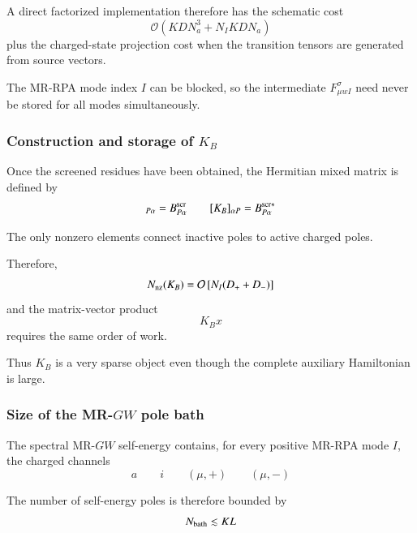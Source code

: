 \documentclass[aip,jcp,reprint,noshowkeys,superscriptaddress]{revtex4-1}
\begin{document}
A direct factorized implementation therefore has the schematic cost
\begin{equation}
  \mathcal O
  \left(
    KDN_a^3
    +
    N_IKDN_a
  \right)
  \label{eq:B-factorized-cost}
\end{equation}
plus the charged-state projection cost when the transition tensors are
generated from source vectors.

The MR-RPA mode index $I$ can be blocked, so the intermediate
$F_{\mu w I}^{\sigma}$ need never be stored for all modes
simultaneously.


\subsubsection{Construction and storage of \texorpdfstring{$K_B$}{KB}}

Once the screened residues have been obtained, the Hermitian mixed
matrix is defined by
\begin{equation}
  [K_B]_{P\alpha}
  =
  B_{P\alpha}^{\rm scr}
  \qquad
  [K_B]_{\alpha P}
  =
  B_{P\alpha}^{{\rm scr}*}
\end{equation}

The only nonzero elements connect inactive poles to active charged
poles.

Therefore,
\begin{equation}
  N_{\rm nz}(K_B)
  =
  \mathcal O
  \left[
    N_I(D_++D_-)
  \right]
  \label{eq:KB-nnz}
\end{equation}
and the matrix-vector product
\begin{equation}
  K_Bx
\end{equation}
requires the same order of work.

Thus $K_B$ is a very sparse object even though the complete auxiliary
Hamiltonian is large.


\subsubsection{Size of the MR-$GW$ pole bath}

The spectral MR-$GW$ self-energy contains, for every positive MR-RPA
mode $I$, the charged channels
\begin{equation}
  a
  \qquad
  i
  \qquad
  (\mu,+)
  \qquad
  (\mu,-)
\end{equation}

The number of self-energy poles is therefore bounded by
\begin{equation}
  N_{\rm bath}
  \lesssim
  K L
  \label{eq:Nbath}
\end{equation}
\end{document}
